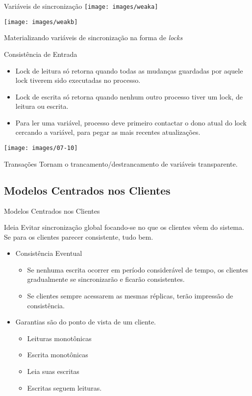 \begin{frame}{Variáveis de sincronização}
\texttt{[image: images/weaka]}

\texttt{[image: images/weakb]}

Materializando variáveis de sincronização na forma de \emph{locks}
\end{frame}


\begin{frame}{Consistência de Entrada}
\begin{itemize}
	\item Lock de leitura só retorna quando todas as mudanças guardadas por aquele lock tiverem sido executadas no processo.
	\item Lock de escrita só retorna quando nenhum outro processo tiver um lock, de leitura ou escrita.
	\item Para ler uma variável, processo deve primeiro contactar o dono atual do lock cercando a variável, para pegar as mais recentes atualizações.
\end{itemize}

\texttt{[image: images/07-10]}
\end{frame}

\begin{frame}{Transações}
Tornam o trancamento/destrancamento de variáveis transparente.
\end{frame}




\subsection{Modelos Centrados nos Clientes}

\begin{frame}{Modelos Centrados nos Clientes}
\begin{block}{Ideia}
	Evitar sincronização global focando-se no que os clientes vêem do sistema. Se para os clientes parecer consistente, tudo bem.
\end{block}

\begin{itemize}
	\item Consistência Eventual
	\begin{itemize}
		\item Se nenhuma escrita ocorrer em período considerável de tempo, os clientes gradualmente se sincronizarão e ficarão consistentes.
		\item Se clientes sempre acessarem as mesmas réplicas, terão impressão de consistência.
	\end{itemize}
	\item Garantias são do ponto de vista de \alert{um} cliente.
	\begin{itemize}
		\item Leituras monotônicas
		\item Escrita monotônicas
		\item Leia suas escritas
		\item Escritas seguem leituras.
	\end{itemize}
\end{itemize}
\end{frame}

